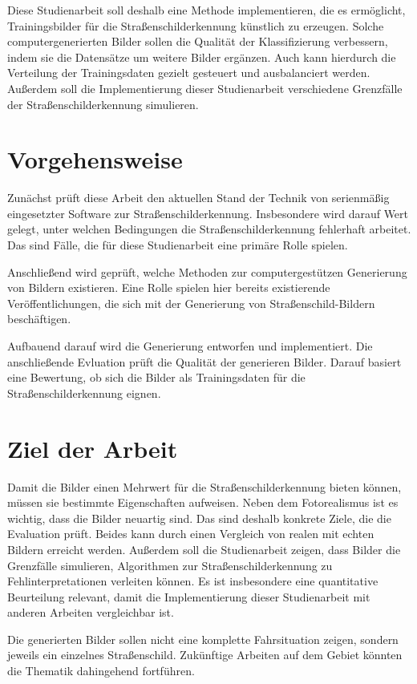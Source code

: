 Diese Studienarbeit soll deshalb eine Methode implementieren, die es ermöglicht, Trainingsbilder für die Straßenschilderkennung künstlich zu erzeugen. Solche computergenerierten Bilder sollen die Qualität der Klassifizierung verbessern, indem sie die Datensätze um weitere Bilder ergänzen. Auch kann hierdurch die Verteilung der Trainingsdaten gezielt gesteuert und ausbalanciert werden. Außerdem soll die Implementierung dieser Studienarbeit verschiedene Grenzfälle der Straßenschilderkennung simulieren.

\section{Vorgehensweise}

Zunächst prüft diese Arbeit den aktuellen Stand der Technik von serienmäßig eingesetzter Software zur Straßenschilderkennung. Insbesondere wird darauf Wert gelegt, unter welchen Bedingungen die Straßenschilderkennung fehlerhaft arbeitet. Das sind Fälle, die für diese Studienarbeit eine primäre Rolle spielen.

Anschließend wird geprüft, welche Methoden zur computergestützen Generierung von Bildern existieren. Eine Rolle spielen hier bereits existierende Veröffentlichungen, die sich mit der Generierung von Straßenschild-Bildern beschäftigen.

Aufbauend darauf wird die Generierung entworfen und implementiert. Die anschließende Evluation prüft die Qualität der generieren Bilder. Darauf basiert eine Bewertung, ob sich die Bilder als Trainingsdaten für die Straßenschilderkennung eignen.

\section{Ziel der Arbeit}
\label{chap:ziel-der-arbeit}

Damit die Bilder einen Mehrwert für die Straßenschilderkennung bieten können, müssen sie bestimmte Eigenschaften aufweisen. Neben dem Fotorealismus ist es wichtig, dass die Bilder neuartig sind. Das sind deshalb konkrete Ziele, die die Evaluation prüft. Beides kann durch einen Vergleich von realen mit echten Bildern erreicht werden. Außerdem soll die Studienarbeit zeigen, dass Bilder die Grenzfälle simulieren, Algorithmen zur Straßenschilderkennung zu Fehlinterpretationen verleiten können. Es ist insbesondere eine quantitative Beurteilung relevant, damit die Implementierung dieser Studienarbeit mit anderen Arbeiten vergleichbar ist. 

Die generierten Bilder sollen nicht eine komplette Fahrsituation zeigen, sondern jeweils ein einzelnes Straßenschild. Zukünftige Arbeiten auf dem Gebiet könnten die Thematik dahingehend fortführen.